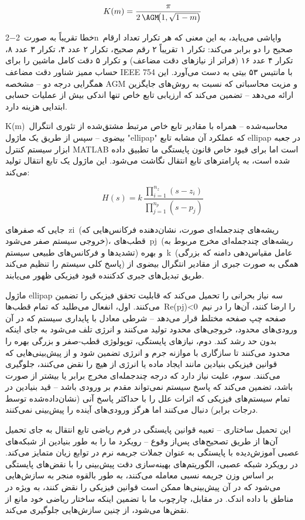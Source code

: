 \documentclass[12pt, a4paper]{article}
\begin{document}
\begin{equation}
K(m)=\frac{\pi}{2\,\AGM\!\bigl(1,\sqrt{1-m}\bigr)}
\end{equation}

خطا تقریباً به صورت 2−2n واپاشی می‌یابد، به این معنی که هر تکرار تعداد ارقام صحیح را دو برابر می‌کند: تکرار ۱ تقریباً ۲ رقم صحیح، تکرار ۲ عدد ۴، تکرار ۳ عدد ۸، تکرار ۴ عدد ۱۶ (فراتر از نیازهای دقت مضاعف) و تکرار ۵ دقت کامل ماشین را برای حساب ممیز شناور دقت مضاعف IEEE 754 با مانتیس ۵۳ بیتی به دست می‌آورد. این همگرایی درجه دو – مشخصه AGM و مزیت محاسباتی که نسبت به روش‌های جایگزین ارائه می‌دهد – تضمین می‌کند که ارزیابی تابع خاص تنها اندکی بیش از عملیات حسابی ابتدایی هزینه دارد.

K(m) محاسبه‌شده – همراه با مقادیر تابع خاص مرتبط مشتق‌شده از تئوری انتگرال بیضوی – سپس از طریق یک ماژول "ellipap" که عملکرد آن مشابه تابع ellipap در جعبه ابزار سیستم کنترل MATLAB است اما برای قیود خاص قانون پایستگی ما تطبیق داده شده است، به پارامترهای تابع انتقال نگاشت می‌شود. این ماژول یک تابع انتقال تولید می‌کند:

\begin{equation}
H(s)=k\,\frac{\prod_{i=1}^{n_{z}}(s-z_{i})}{\prod_{j=1}^{n_{p}}(s-p_{j})}
\end{equation}

جایی که صفرهای zi (ریشه‌های چندجمله‌ای صورت، نشان‌دهنده فرکانس‌هایی که خروجی سیستم صفر می‌شود)، قطب‌های pj (ریشه‌های چندجمله‌ای مخرج مربوط به تشدیدها و فرکانس‌های طبیعی سیستم) و بهره k (عامل مقیاس‌دهی دامنه که بزرگی پاسخ کلی سیستم را تنظیم می‌کند) همگی به صورت جبری از مقادیر انتگرال بیضوی از طریق تبدیل‌های جبری کدکننده قیود فیزیکی ظهور می‌یابند.

ماژول ellipap سه نیاز بحرانی را تحمیل می‌کند که قابلیت تحقق فیزیکی را تضمین می‌کنند. اول، انفعال می‌طلبد که تمام قطب‌ها Re(pj)<0 را ارضا کنند، آن‌ها را در نیم صفحه چپ صفحه مختلط قرار می‌دهد – شرطی معادل با پایداری سیستم که در آن ورودی‌های محدود، خروجی‌های محدود تولید می‌کنند و انرژی تلف می‌شود به جای اینکه بدون حد رشد کند. دوم، نیازهای پایستگی، توپولوژی قطب-صفر و بزرگی بهره را محدود می‌کنند تا سازگاری با موازنه جرم و انرژی تضمین شود و از پیش‌بینی‌هایی که قوانین فیزیکی بنیادین مانند ایجاد ماده یا انرژی از هیچ را نقض می‌کنند، جلوگیری می‌کنند. سوم، علیت نیاز دارد که درجه چندجمله‌ای مخرج برابر یا بیشتر از صورت باشد، تضمین می‌کند که پاسخ سیستم نمی‌تواند مقدم بر ورودی باشد – قید بنیادین در تمام سیستم‌های فیزیکی که اثرات علل را با حداکثر پاسخ آنی (نشان‌داده‌شده توسط درجات برابر) دنبال می‌کنند اما هرگز ورودی‌های آینده را پیش‌بینی نمی‌کنند.

این تحمیل ساختاری – تعبیه قوانین پایستگی در فرم ریاضی تابع انتقال به جای تحمیل آن‌ها از طریق تصحیح‌های پس‌از وقوع – رویکرد ما را به طور بنیادین از شبکه‌های عصبی آموزش‌دیده با پایستگی به عنوان جملات جریمه نرم در توابع زیان متمایز می‌کند. در رویکرد شبکه عصبی، الگوریتم‌های بهینه‌سازی دقت پیش‌بینی را با نقض‌های پایستگی بر اساس وزن جریمه نسبی معامله می‌کنند، به طور بالقوه منجر به سازش‌هایی می‌شود که در آن پیش‌بینی‌ها ممکن است قوانین فیزیکی را نقض کنند، به ویژه در مناطق با داده اندک. در مقابل، چارچوب ما با تضمین اینکه ساختار ریاضی خود مانع از نقض‌ها می‌شود، از چنین سازش‌هایی جلوگیری می‌کند.
\end{document}

